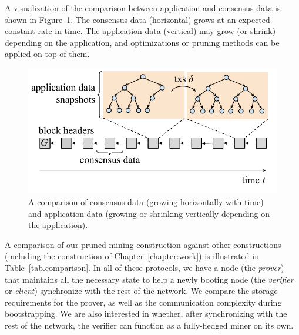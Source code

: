 A visualization of the comparison between application and consensus data is shown in
Figure~\ref{fig.data}. The consensus data (horizontal) grows at an expected
constant rate in time. The application data (vertical) may grow (or shrink)
depending on the application, and optimizations or pruning methods can be applied
on top of them.

\begin{figure}[h]
\begin{center}
  \includegraphics[width=0.8\columnwidth]{chapters/superlight/figures/data.pdf}
  \caption{A comparison of consensus data (growing horizontally with time) and
           application data (growing or shrinking vertically depending on the
           application).}
  \label{fig.data}
  \end{center}
\end{figure}

A comparison of our pruned mining construction against other constructions
(including the construction of Chapter~\ref{chapter:work})
is illustrated in Table~\ref{tab.comparison}.
In all of these protocols, we have a node (the \emph{prover}) that maintains all the necessary
state to help a newly booting node (the \emph{verifier} or \emph{client}) synchronize with the
rest of the network.  We compare the storage requirements for the prover, as well as the
communication complexity during bootstrapping. We are also interested
in whether, after synchronizing with the rest of the network, the verifier can function
as a fully-fledged miner on its own.

